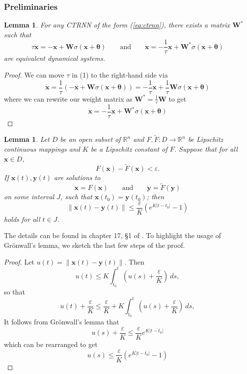 \documentclass[11pt, letterpaper]{article}
\newtheorem{lemma}[theorem]{Lemma}
\begin{document}
\subsubsection{Preliminaries}

\begin{lemma}\label{lmm:ctrnn_equiv}
    For any CTRNN of the form (\ref{eq:ctrnn}), there exists a matrix $\mathbf{W^\ast}$ such that 
    \[
    \tau\mathbf{\dot{x}}=-\mathbf{x}+\mathbf{W}\sigma\left( \mathbf{x} + \mathbf{\theta} \right) \qquad \text{and} \qquad \mathbf{\dot{x}} = -\frac{1}{\tau}\mathbf{x}+\mathbf{W^\ast}\sigma\left( \mathbf{x}+ \mathbf{\theta}\right)
    \]
    are equivalent dynamical systems.
\end{lemma}

\begin{proof}
We can move $\tau$ in (1) to the right-hand side via 
\[
\mathbf{\dot{x}}=\frac{1}{\tau}\left(-\mathbf{x}+\mathbf{W}\sigma\left( \mathbf{x} + \mathbf{\theta} \right)\right)=-\frac{1}{\tau}\mathbf{x}+\frac{1}{\tau}\mathbf{W}\sigma\left( \mathbf{x} + \mathbf{\theta} \right)
\]
where we can rewrite our weight matrix as $\mathbf{W^\ast}=\frac{1}{\tau}\mathbf{W}$ to get
\begin{equation}
    \mathbf{\dot{x}} = -\frac{1}{\tau}\mathbf{x}+\mathbf{W^\ast}\sigma\left( \mathbf{x}+ \mathbf{\theta}\right)
\end{equation}
\end{proof}

\begin{lemma}\label{lmm:gronwall}
    Let $D$ be an open subset of $\mathbb{R}^n$ and $F,\tilde{F}:D\to\mathbb{R}^n$ be Lipschitz continuous mappings and $K$ be a Lipschitz constant of $F$. Suppose that for all $\mathbf{x}\in D$, \[F(\mathbf{x})-\tilde{F}(\mathbf{x})<\varepsilon.\] If $\mathbf{x}(t),\mathbf{y}(t)$ are solutions to \[\dot{\mathbf{x}}=F(\mathbf{x})\qquad \text{and}\qquad \dot{\mathbf{y}}=\tilde{F}(\mathbf{y})\] on some interval $J$, such that $\mathbf{x}(t_0)=\mathbf{y}(t_0)$; then \[\| \mathbf{x}(t)-\mathbf{y}(t)\| \leq \frac{\varepsilon}{K}\left( e^{K|t-t_0|} -1 \right)\] holds for all $t\in J$.
\end{lemma}
The details can be found in chapter 17, \S 1 of \citet{hirsch2012differential}. To highlight the usage of Grönwall's lemma, we sketch the last few steps of the proof.
\begin{proof}
Let $u(t)=\| \mathbf{x}(t)-\mathbf{y}(t) \|$. Then
\[
u(t)\leq K \int_{t_0}^t \left(u(s) +\frac{\varepsilon}{K} \right)\ ds,
\]
so that
\[
u(t) + \frac{\varepsilon}{K} \leq \frac{\varepsilon}{K}+ K \int_{t_0}^t \left(u(s) +\frac{\varepsilon}{K} \right)\ ds,
\]
It follows from Grönwall's lemma that
\[
u(s)+\frac{\varepsilon}{K}\leq \frac{\varepsilon}{K}e^{K|t-t_0|}
\]
which can be rearranged to get
\[
u(s)\leq \frac{\varepsilon}{K}\left(e^{K|t-t_0|}-1\right)
\]
\end{proof}
\end{document}
